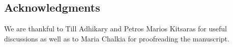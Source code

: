 \documentclass[10pt]{article}
\begin{document}


\subsection*{Acknowledgments}

We are thankful to Till Adhikary and Petros Marios Kitsaras for useful discussions as well as to Maria Chalkia for proofreading the manuscript. 

\renewcommand*{\bibfont}{\small}
\printbibliography
\end{document}
